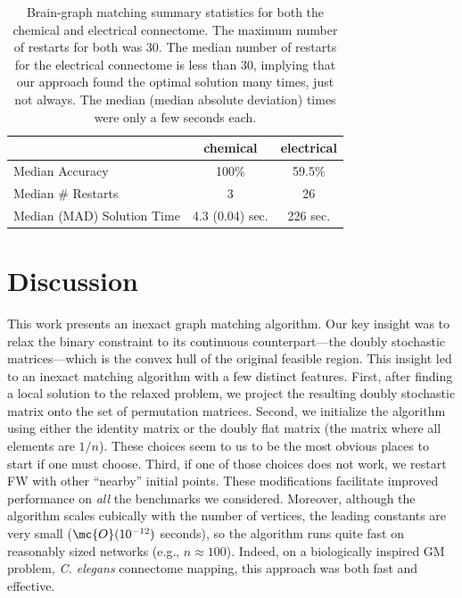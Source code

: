 \documentclass[10pt,journal,cspaper,compsoc]{IEEEtran}
\begin{document}
\begin{table}
\caption{Brain-graph matching summary statistics for both the chemical and electrical connectome.  The maximum number of restarts for both was 30.  The median number of restarts for the electrical connectome is less than 30, implying that our approach found the optimal solution many times, just not always.  The median (median absolute deviation) times were only a few seconds each.}
	\label{tab:1}
\begin{center}
\begin{tabular}{|l|c|c|}
\hline	 					& chemical 		& electrical  \\ \hline
	Median Accuracy    &       100\%            &             59.5\% \\
	Median \# Restarts  &         3            &                   26 \\
	Median (MAD) Solution Time     &  4.3 (0.04) sec.      &    226 sec. \\ \hline
\end{tabular} 
\end{center}
\end{table}

 


\section{Discussion}

This work presents an inexact graph matching algorithm.  Our key insight was to relax the binary constraint to its continuous counterpart---the doubly stochastic matrices---which is the convex hull of the original feasible region.  This insight led to an inexact matching algorithm with a few distinct features. %
First, after finding a local solution to the relaxed problem, we project the resulting doubly stochastic matrix onto the set of permutation matrices.  Second, we initialize the algorithm using either the identity matrix or the doubly flat matrix (the matrix where all elements are $1/n$).  These choices seem to us to be the most obvious places to start if one must choose.  Third, if one of those choices does not work, we restart FW with other ``nearby'' initial points.  These modifications facilitate improved performance on \emph{all} the benchmarks we considered.  Moreover, although the algorithm scales cubically with the number of vertices, the leading constants are very small ($\mc{O}(10^{-12})$ seconds), so the algorithm runs quite fast on reasonably sized networks (e.g., $n \approx 100$).  Indeed, on a biologically inspired GM problem, \emph{C. elegans} connectome mapping, this approach was both fast and effective.  
\end{document}
